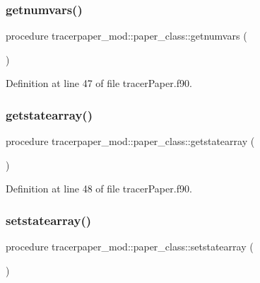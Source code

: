 \subsubsection{\texorpdfstring{getnumvars()}{getnumvars()}}
{\footnotesize\ttfamily procedure tracerpaper\+\_\+mod\+::paper\+\_\+class\+::getnumvars (\begin{DoxyParamCaption}{ }\end{DoxyParamCaption})\hspace{0.3cm}{\ttfamily [private]}}



Definition at line 47 of file tracer\+Paper.\+f90.

\mbox{\label{structtracerpaper__mod_1_1paper__class_a21d6ed82c83e42c34957d7e7d6013b60}} 
\subsubsection{\texorpdfstring{getstatearray()}{getstatearray()}}
{\footnotesize\ttfamily procedure tracerpaper\+\_\+mod\+::paper\+\_\+class\+::getstatearray (\begin{DoxyParamCaption}{ }\end{DoxyParamCaption})\hspace{0.3cm}{\ttfamily [private]}}



Definition at line 48 of file tracer\+Paper.\+f90.

\mbox{\label{structtracerpaper__mod_1_1paper__class_aceade1b3528c222d5633f1c7e26df2dc}} 
\subsubsection{\texorpdfstring{setstatearray()}{setstatearray()}}
{\footnotesize\ttfamily procedure tracerpaper\+\_\+mod\+::paper\+\_\+class\+::setstatearray (\begin{DoxyParamCaption}{ }\end{DoxyParamCaption})\hspace{0.3cm}{\ttfamily [private]}}



